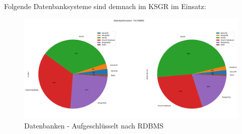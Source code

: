 Folgende Datenbanksysteme sind demnach im KSGR im Einsatz:


\begin{figure}[H]
    \centering
    \includegraphics[width=1\linewidth]{source/pandas_data_chart_plotter/db_inventory_per_rdbms}
    \caption{Datenbanken - Aufgeschlüsselt nach RDBMS}
    \label{fig:db_inventory_per_rdbms}
\end{figure}

